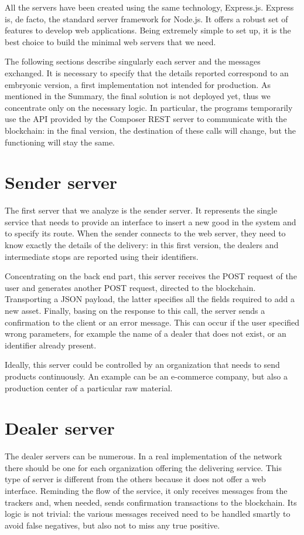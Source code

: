 All the servers have been created using the same technology, Express.js. Express is, de facto, the standard server framework for Node.js. It offers a robust set of features to develop web applications. Being extremely simple to set up, it is the best choice to build the minimal web servers that we need.

The following sections describe singularly each server and the messages exchanged. It is necessary to specify that the details reported correspond to an embryonic version, a first implementation not intended for production. As mentioned in the Summary, the final solution is not deployed yet, thus we concentrate only on the necessary logic. In particular, the programs temporarily use the API provided by the Composer REST server to communicate with the blockchain: in the final version, the destination of these calls will change, but the functioning will stay the same.

\section{Sender server}
The first server that we analyze is the sender server. It represents the single service that needs to provide an interface to insert a new good in the system and to specify its route. When the sender connects to the web server, they need to know exactly the details of the delivery: in this first version, the dealers and intermediate stops are reported using their identifiers.

Concentrating on the back end part, this server receives the POST request of the user and generates another POST request, directed to the blockchain. Transporting a JSON payload, the latter specifies all the fields required to add a new asset. Finally, basing on the response to this call, the server sends a confirmation to the client or an error message. This can occur if the user specified wrong parameters, for example the name of a dealer that does not exist, or an identifier already present. 

Ideally, this server could be controlled by an organization that needs to send products continuously. An example can be an e-commerce company, but also a production center of a particular raw material.

\section{Dealer server}
The dealer servers can be numerous. In a real implementation of the network there should be one for each organization offering the delivering service. This type of server is different from the others because it does not offer a web interface. Reminding the flow of the service, it only receives messages from the trackers and, when needed, sends confirmation transactions to the blockchain. Its logic is not trivial: the various messages received need to be handled smartly to avoid false negatives, but also not to miss any true positive.

